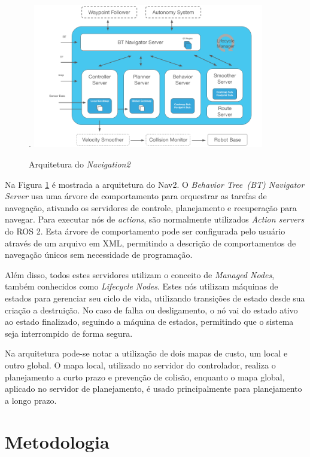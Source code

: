 \documentclass[repeatfields,xlists,xpacks,oneside,yearsonly]{ufrgscca}
\begin{document}
\begin{figure}[htbp]
    {
        \centering
        \caption{Arquitetura do \textit{Navigation2}}.
        \label{fig:nav2_arc}
        \includegraphics[width=0.9\textwidth]{nav2_architecture.png}\\
    }
    {}
\end{figure}

Na Figura \ref{fig:nav2_arc} é mostrada a arquitetura do Nav2.
O \textit{Behavior Tree~(BT) Navigator Server} usa uma árvore de comportamento para
orquestrar as tarefas de navegação, ativando os servidores de controle, planejamento e
recuperação para navegar.
Para executar nós de \textit{actions}, são normalmente utilizados
\textit{Action servers} do ROS 2.
Esta árvore de comportamento pode ser configurada pelo usuário através de um arquivo
em XML, permitindo a descrição de comportamentos de navegação únicos sem
necessidade de programação.

Além disso, todos estes servidores utilizam o conceito de \textit{Managed Nodes},
também conhecidos como \textit{Lifecycle Nodes}.
Estes nós utilizam máquinas de estados para gerenciar seu ciclo de vida, utilizando
transições de estado desde sua criação a destruição.
No caso de falha ou desligamento, o nó vai do estado ativo ao estado finalizado,
seguindo a máquina de estados, permitindo que o sistema seja interrompido
de forma segura.

Na arquitetura pode-se notar a utilização de dois mapas de custo, um local e
outro global.
O mapa local, utilizado no servidor do controlador, realiza o planejamento
a curto prazo e prevenção de colisão, enquanto o mapa global,
aplicado no servidor de planejamento, é usado principalmente
para planejamento a longo prazo.

\chapter{Metodologia}
\label{desenvolvimento}
\end{document}
